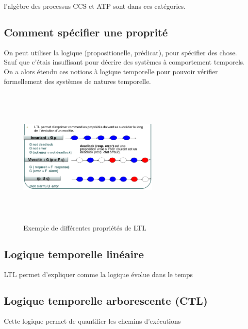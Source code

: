 \documentclass[oneside]{book}
\begin{document}
	l'algèbre des processus CCS et ATP sont dans ces catégories.\\
    
    \subsection{Comment spécifier une proprité}
    On peut utiliser la logique (propositionelle, prédicat), pour spécifier des chose. Sauf que c'étais insuffisant pour décrire des systèmes à comportement temporels. On a alors étendu ces notions à logique temporelle pour pouvoir vérifier formellement des systèmes de natures temporelle.\\
    
    \begin{figure}[!ht]
    	\centering
    	\includegraphics[width = 7cm, height = 7cm, keepaspectratio]{Images/exemple_ltl.png}
    	\caption{Exemple de différentes propriétés de LTL}
    	\label{fig:LTL}
    \end{figure}

    \subsection{Logique temporelle linéaire}
    LTL permet d'expliquer comme la logique évolue dans le temps\\
    
    \subsection{Logique temporelle arborescente (CTL)}
    Cette logique permet de quantifier les chemins d'exécutions\\
    
\end{document}
